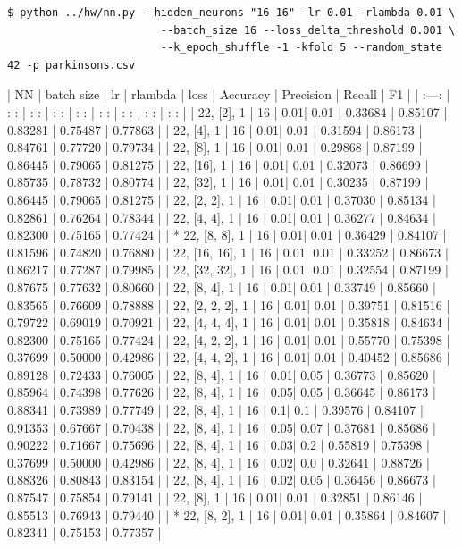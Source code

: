\begin{verbatim}
$ python ../hw/nn.py --hidden_neurons "16 16" -lr 0.01 -rlambda 0.01 \
                        --batch_size 16 --loss_delta_threshold 0.001 \
                        --k_epoch_shuffle -1 -kfold 5 --random_state 42 -p parkinsons.csv

\end{verbatim}

| NN | batch size | lr | rlambda | loss | Accuracy | Precision | Recall | F1 |
| :---: | :-: | :-: | :-: | :-: | :-: | :-: | :-: | :-: |
| 22, [2], 1 | 16 | 0.01| 0.01 | 0.33684 | 0.85107 | 0.83281 | 0.75487 | 0.77863 |
| 22, [4], 1 | 16 | 0.01| 0.01 | 0.31594 | 0.86173 | 0.84761 | 0.77720 | 0.79734 |  
| 22, [8], 1 | 16 | 0.01| 0.01 | 0.29868 | 0.87199 | 0.86445 | 0.79065 | 0.81275 |  
| 22, [16], 1 | 16 | 0.01| 0.01 | 0.32073 | 0.86699 | 0.85735 | 0.78732 | 0.80774 |
| 22, [32], 1 | 16 | 0.01| 0.01 | 0.30235 | 0.87199 | 0.86445 | 0.79065 | 0.81275 |  
| 22, [2, 2], 1 | 16 | 0.01| 0.01 | 0.37030 | 0.85134 | 0.82861 | 0.76264 | 0.78344 |
| 22, [4, 4], 1 | 16 | 0.01| 0.01 | 0.36277 | 0.84634 | 0.82300 | 0.75165 | 0.77424 |
| * 22, [8, 8], 1 | 16 | 0.01| 0.01 | 0.36429 | 0.84107 | 0.81596 | 0.74820 | 0.76880 |
| 22, [16, 16], 1 | 16 | 0.01| 0.01 | 0.33252 | 0.86673 | 0.86217 | 0.77287 | 0.79985 |
| 22, [32, 32], 1 | 16 | 0.01| 0.01 | 0.32554 | 0.87199 | 0.87675 | 0.77632 | 0.80660 |
| 22, [8, 4], 1 | 16 | 0.01| 0.01 | 0.33749 | 0.85660 | 0.83565 | 0.76609 | 0.78888 |
| 22, [2, 2, 2], 1 | 16 | 0.01| 0.01 | 0.39751 | 0.81516 | 0.79722 | 0.69019 | 0.70921 |
| 22, [4, 4, 4], 1 | 16 | 0.01| 0.01 | 0.35818 | 0.84634 | 0.82300 | 0.75165 | 0.77424 |
| 22, [4, 2, 2], 1 | 16 | 0.01| 0.01 | 0.55770 | 0.75398 | 0.37699 | 0.50000 | 0.42986 |
| 22, [4, 4, 2], 1 | 16 | 0.01| 0.01 | 0.40452 | 0.85686 | 0.89128 | 0.72433 | 0.76005 |
| 22, [8, 4], 1 | 16 | 0.01| 0.05 | 0.36773 | 0.85620 | 0.85964 | 0.74398 | 0.77626 |
| 22, [8, 4], 1 | 16 | 0.05| 0.05 | 0.36645 | 0.86173 | 0.88341 | 0.73989 | 0.77749 |
| 22, [8, 4], 1 | 16 | 0.1| 0.1 | 0.39576 | 0.84107 | 0.91353 | 0.67667 | 0.70438 |
| 22, [8, 4], 1 | 16 | 0.05| 0.07 | 0.37681 | 0.85686 | 0.90222 | 0.71667 | 0.75696 |
| 22, [8, 4], 1 | 16 | 0.03| 0.2 | 0.55819 | 0.75398 | 0.37699 | 0.50000 | 0.42986 |
| 22, [8, 4], 1 | 16 | 0.02| 0.0 | 0.32641 | 0.88726 | 0.88326 | 0.80843 | 0.83154 |
| 22, [8, 4], 1 | 16 | 0.02| 0.05 | 0.36456 | 0.86673 | 0.87547 | 0.75854 | 0.79141 |
| 22, [8], 1 | 16 | 0.01| 0.01 | 0.32851 | 0.86146 | 0.85513 | 0.76943 | 0.79440 |
| * 22, [8, 2], 1 | 16 | 0.01| 0.01 | 0.35864 | 0.84607 | 0.82341 | 0.75153 | 0.77357 |

